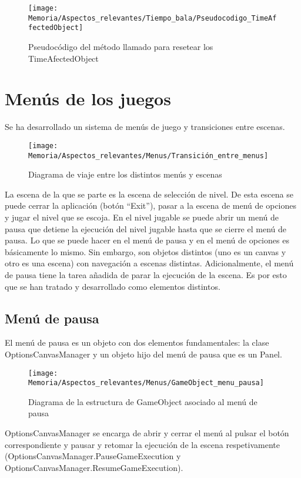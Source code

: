 \begin{figure}[h]
\texttt{[image: Memoria/Aspectos\_relevantes/Tiempo\_bala/Pseudocodigo\_TimeAffectedObject]}
\caption{Pseudocódigo del método llamado para resetear los TimeAfectedObject}
\end{figure}

\section{Menús de los juegos}
Se ha desarrollado un sistema de menús de juego y transiciones entre escenas.

\begin{figure}[h]
\texttt{[image: Memoria/Aspectos\_relevantes/Menus/Transición\_entre\_menus]}
\caption{Diagrama de viaje entre los distintos menús y escenas}
\end{figure}

La escena de la que se parte es la escena de selección de nivel. De esta escena se puede cerrar la aplicación (botón “Exit”), pasar a la escena de menú de opciones y jugar el nivel que se escoja.
En el nivel jugable se puede abrir un menú de pausa que detiene la ejecución del nivel jugable hasta que se cierre el menú de pausa.
Lo que se puede hacer en el menú de pausa y en el menú de opciones es básicamente lo mismo. Sin embargo, son objetos distintos (uno es un canvas y otro es una escena) con navegación a escenas distintas. Adicionalmente, el menú de pausa tiene la tarea añadida de parar la ejecución de la escena. Es por esto que se han tratado y desarrollado como elementos distintos.

\subsection{Menú de pausa}
El menú de pausa es un objeto con dos elementos fundamentales: la clase OptionsCanvasManager y un objeto hijo del menú de pausa que es un Panel.

\clearpage
\begin{figure}[h]
\texttt{[image: Memoria/Aspectos\_relevantes/Menus/GameObject\_menu\_pausa]}
\caption{Diagrama de la estructura de GameObject asociado al menú de pausa}
\end{figure}

OptionsCanvasManager se encarga de abrir y cerrar el menú al pulsar el botón correspondiente y pausar y retomar la ejecución de la escena respetivamente (OptionsCanvasManager.PauseGameExecution y OptionsCanvasManager.ResumeGameExecution).

